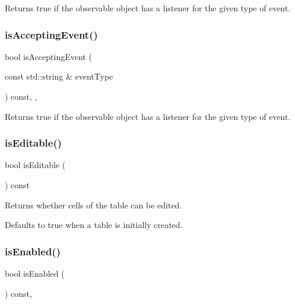 Returns true if the observable object has a listener for the given type of event. 

\mbox{\label{classGObservable_a3b1c689267eda44e65a2213e7de38b23}} 
\subsubsection{\texorpdfstring{is\+Accepting\+Event()}{isAcceptingEvent()}\hspace{0.1cm}{\footnotesize\ttfamily [3/3]}}
{\footnotesize\ttfamily bool is\+Accepting\+Event (\begin{DoxyParamCaption}\item[{const std\+::string \&}]{event\+Type }\end{DoxyParamCaption}) const\hspace{0.3cm}{\ttfamily [protected]}, {\ttfamily [virtual]}, {\ttfamily [inherited]}}



Returns true if the observable object has a listener for the given type of event. 

\mbox{\label{classGTable_a012b5afb54e037e6c5498cf0932a521b}} 
\subsubsection{\texorpdfstring{is\+Editable()}{isEditable()}}
{\footnotesize\ttfamily bool is\+Editable (\begin{DoxyParamCaption}{ }\end{DoxyParamCaption}) const\hspace{0.3cm}{\ttfamily [virtual]}}



Returns whether cells of the table can be edited. 

Defaults to true when a table is initially created. \mbox{\label{classGInteractor_aacb819fb241851fd9fc045271baa4034}} 
\subsubsection{\texorpdfstring{is\+Enabled()}{isEnabled()}}
{\footnotesize\ttfamily bool is\+Enabled (\begin{DoxyParamCaption}{ }\end{DoxyParamCaption}) const\hspace{0.3cm}{\ttfamily [virtual]}, {\ttfamily [inherited]}}



